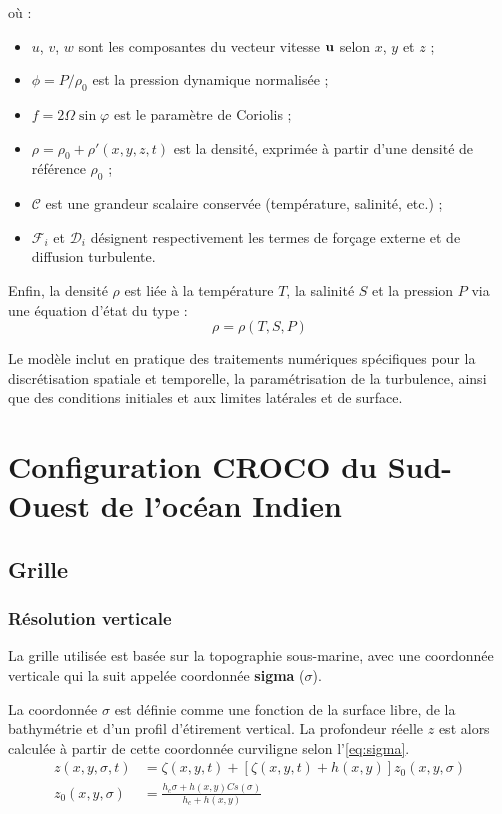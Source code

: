 où :
\begin{itemize}
    \item $u$, $v$, $w$ sont les composantes du vecteur vitesse $\mathbf{u}$ selon $x$, $y$ et $z$ ;
    \item $\phi = P / \rho_0$ est la pression dynamique normalisée ;
    \item $f = 2\Omega \sin\varphi$ est le paramètre de Coriolis ;
    \item $\rho = \rho_0 + \rho'(x,y,z,t)$ est la densité, exprimée à partir d'une densité de référence $\rho_0$ ;
    \item $\mathcal{C}$ est une grandeur scalaire conservée (température, salinité, etc.) ;
    \item $\mathcal{F}_i$ et $\mathcal{D}_i$ désignent respectivement les termes de forçage externe et de diffusion turbulente.
\end{itemize}

Enfin, la densité $\rho$ est liée à la température $T$, la salinité $S$ et la pression $P$ via une équation d'état du type :
\begin{equation}
    \rho = \rho(T, S, P)
\end{equation}

Le modèle inclut en pratique des traitements numériques spécifiques pour la discrétisation spatiale et temporelle, la paramétrisation de la turbulence, ainsi que des conditions initiales et aux limites latérales et de surface.

\section{Configuration \textbf{CROCO} du Sud-Ouest de l'océan Indien}

\subsection{Grille}
\subsubsection{Résolution verticale}

La grille utilisée est basée sur la topographie sous-marine, avec une coordonnée verticale qui la suit appelée coordonnée \textbf{sigma} ($\sigma$).

La coordonnée $\sigma$ est définie comme une fonction de la surface libre, de la bathymétrie et d’un profil d’étirement vertical. La profondeur réelle $z$ est alors calculée à partir de cette coordonnée curviligne selon l'\autoref{eq:sigma}.
\begin{subequations}
\label{eq:sigma}
\begin{align}
    z(x, y, \sigma, t) &= \zeta(x, y, t) + \left[ \zeta(x, y, t) + h(x, y) \right] z_0(x, y, \sigma) \\
    z_0(x, y, \sigma) &= \frac{h_c \sigma + h(x, y) Cs(\sigma)}{h_c + h(x, y)}
\end{align}
\end{subequations}

